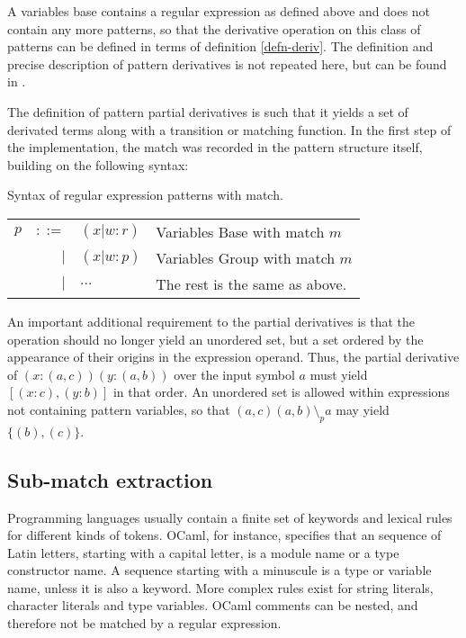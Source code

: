 A variables base contains a regular expression as defined above and does not
contain any more patterns, so that the derivative operation on this class of
patterns can be defined in terms of definition \ref{defn-deriv}. The definition
and precise description of pattern derivatives is not repeated here, but can be
found in \cite{pdpat}.

The definition of pattern partial derivatives is such that it yields a set of
derivated terms along with a transition or matching function. In the first step
of the implementation, the match was recorded in the pattern structure itself,
building on the following syntax:

\begin{defn}
   \label{defn-pat-with-match}
   Syntax of regular expression patterns with match.

   \begin{tabular}{lrll}
      $p$	& $::=$	& $(x|w:r)$	& Variables Base  with match $m$	\\
		& $|$	& $(x|w:p)$	& Variables Group with match $m$	\\
		& $|$	& $\dots$	& The rest is the same as above.	\\
   \end{tabular}
\end{defn}

An important additional requirement to the partial derivatives is that the
operation should no longer yield an unordered set, but a set ordered by the
appearance of their origins in the expression operand. Thus, the partial
derivative of $(x:(a,c))(y:(a,b))$ over the input symbol $a$ must yield
$[(x:c),(y:b)]$ in that order. An unordered set is allowed within expressions
not containing pattern variables, so that $(a,c)(a,b) \setminus_p a$ may yield
$\{(b),(c)\}$.

\subsection{Sub-match extraction}

Programming languages usually contain a finite set of keywords and lexical rules
for different kinds of tokens. OCaml, for instance, specifies that an sequence
of Latin letters, starting with a capital letter, is a module name or a type
constructor name. A sequence starting with a minuscule is a type or variable
name, unless it is also a keyword. More complex rules exist for string literals,
character literals and type variables. OCaml comments can be nested, and
therefore not be matched by a regular expression.

